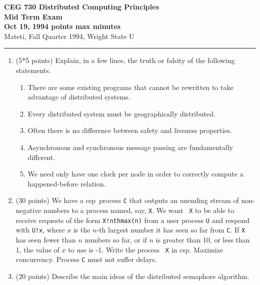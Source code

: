 \def\fat{\framebox[1mm]{\rule{0mm}{2mm}}}
\def\CSP{{\sc csp}}
\def\RPC{{\sc rpc}}
\parindent=0pt



{\bf CEG 
\large \bf 730 Distributed Computing Principles\\[5pt]
\large Mid Term Exam\\[10pt]
Oct 19, 1994  points max  minutes\\
}
\bigskip
{Mateti,  Fall Quarter 1994, Wright State U}\\[-5pt]
\hrule

\begin{enumerate}

\item (5*5 points)
Explain, in a few lines, the truth or falsity of the following
statements.

\begin{enumerate}
\item There are some existing programs that cannot be rewritten
to take advantage of distributed systems.

\item
Every distributed system must be geographically
distributed.

\item
Often there is no difference between safety and liveness properties.

\item Asynchronous and synchronous message passing are fundamentally
different.

\item
We need only have one clock per node in order to correctly compute a
happened-before relation.



\end{enumerate}

\item (30 points)
We have a \CSP\ process {\tt C} that outputs an unending stream of
non-negative numbers to a process named, say, {\tt X}.  We want {\tt
X} to be able to receive requests of the form {\tt X!nthmax(n)} from a
user process {\tt U} and respond with {\tt U!x}, where $x$ is the
$n$-th largest number it has seen so far from {\tt C}.  If {\tt X}
has seen fewer than $n$ numbers so far, or if $n$ is greater than 10,
or less than 1, the value of $x$ to use is -1.  Write the process {\tt
X} in \CSP.  Maximize concurrency.  Process {\tt C} must not suffer
delays.

\item (20 points)
Describe the main ideas of the distributed semaphore algorithm.



\end{enumerate}
